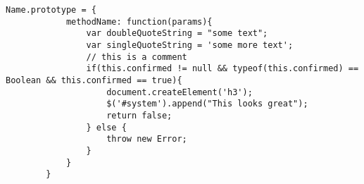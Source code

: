 \documentclass{article}
\begin{document}
	
	\medskip
	\begin{lstlisting}[caption=My Javascript Example]
		Name.prototype = {
			methodName: function(params){
				var doubleQuoteString = "some text";
				var singleQuoteString = 'some more text';
				// this is a comment
				if(this.confirmed != null && typeof(this.confirmed) == Boolean && this.confirmed == true){
					document.createElement('h3');
					$('#system').append("This looks great");
					return false;
				} else {
					throw new Error;
				}
			}
		}
	\end{lstlisting}
	
\end{document}
